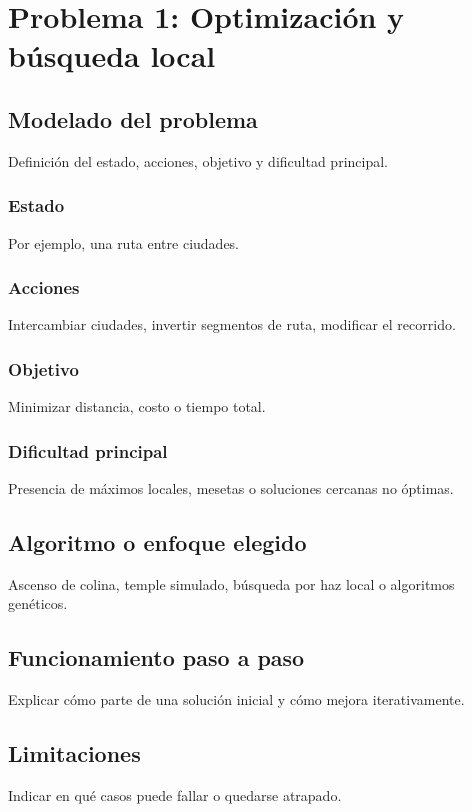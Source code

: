 \section{Problema 1: Optimización y búsqueda local}

\subsection{Modelado del problema}
Definición del estado, acciones, objetivo y dificultad principal.

\subsubsection{Estado}
Por ejemplo, una ruta entre ciudades.

\subsubsection{Acciones}
Intercambiar ciudades, invertir segmentos de ruta, modificar el recorrido.

\subsubsection{Objetivo}
Minimizar distancia, costo o tiempo total.

\subsubsection{Dificultad principal}
Presencia de máximos locales, mesetas o soluciones cercanas no óptimas.

\subsection{Algoritmo o enfoque elegido}
Ascenso de colina, temple simulado, búsqueda por haz local o algoritmos genéticos.

\subsection{Funcionamiento paso a paso}
Explicar cómo parte de una solución inicial y cómo mejora iterativamente.

\subsection{Limitaciones}
Indicar en qué casos puede fallar o quedarse atrapado.